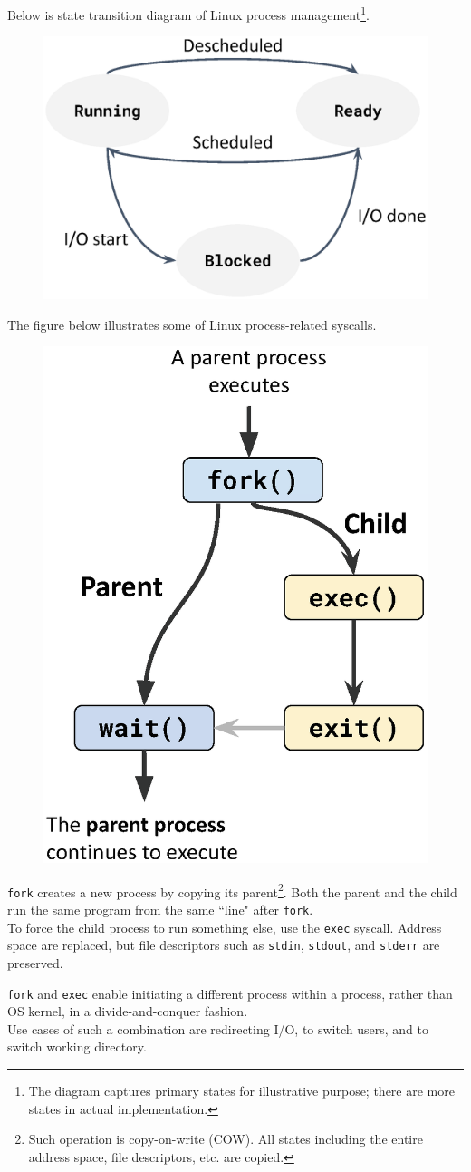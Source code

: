 Below is state transition diagram of Linux process management\footnote{The diagram captures primary states for illustrative purpose; there are more states in actual implementation.}.

\begin{figure}[H]
\centering
\includegraphics[width=0.5\linewidth]{figures/transition.eps}
\end{figure}

The figure below illustrates some of Linux process-related syscalls.

\begin{figure}[H]
\centering
\includegraphics[width=0.35\linewidth]{figures/lifetime.eps}
\end{figure}

\verb|fork| creates a new process by copying its parent\footnote{Such operation is copy-on-write (COW). All states including the entire address space, file descriptors, etc. are copied.}. Both the parent and the child run the same program from the same ``line" after \verb|fork|. \\

To force the child process to run something else, use the \verb|exec| syscall. Address space are replaced, but file descriptors such as \verb|stdin|, \verb|stdout|, and \verb|stderr| are preserved.

\begin{note}
\verb|fork| and \verb|exec| enable initiating a different process within a process, rather than OS kernel, in a divide-and-conquer fashion. \\

Use cases of such a combination are redirecting I/O, to switch users, and to switch working directory.
\end{note}

